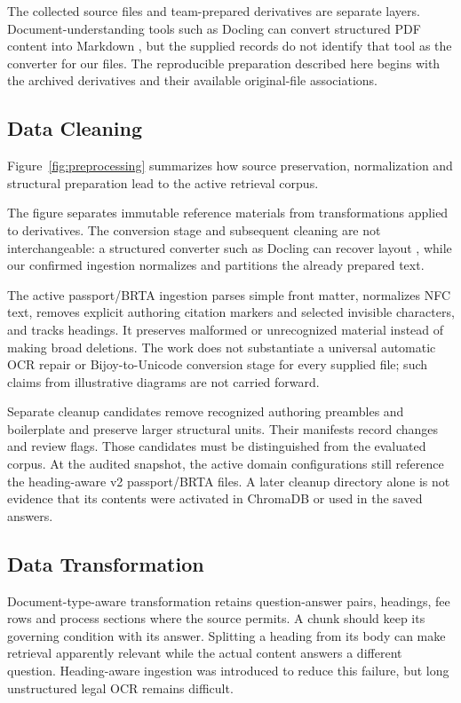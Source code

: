 The collected source files and team-prepared derivatives are separate layers. Document-understanding tools such as Docling can convert structured PDF content into Markdown \cite{docling}, but the supplied records do not identify that tool as the converter for our files. The reproducible preparation described here begins with the archived derivatives and their available original-file associations.

\subsection{Data Cleaning}
Figure~\ref{fig:preprocessing} summarizes how source preservation, normalization and structural preparation lead to the active retrieval corpus.

The figure separates immutable reference materials from transformations applied to derivatives. The conversion stage and subsequent cleaning are not interchangeable: a structured converter such as Docling can recover layout \cite{docling}, while our confirmed ingestion normalizes and partitions the already prepared text.

The active passport/BRTA ingestion parses simple front matter, normalizes NFC text, removes explicit authoring citation markers and selected invisible characters, and tracks headings. It preserves malformed or unrecognized material instead of making broad deletions. The work does not substantiate a universal automatic OCR repair or Bijoy-to-Unicode conversion stage for every supplied file; such claims from illustrative diagrams are not carried forward.

Separate cleanup candidates remove recognized authoring preambles and boilerplate and preserve larger structural units. Their manifests record changes and review flags. Those candidates must be distinguished from the evaluated corpus. At the audited snapshot, the active domain configurations still reference the heading-aware v2 passport/BRTA files. A later cleanup directory alone is not evidence that its contents were activated in ChromaDB or used in the saved answers.

\subsection{Data Transformation}
Document-type-aware transformation retains question-answer pairs, headings, fee rows and process sections where the source permits. A chunk should keep its governing condition with its answer. Splitting a heading from its body can make retrieval apparently relevant while the actual content answers a different question. Heading-aware ingestion was introduced to reduce this failure, but long unstructured legal OCR remains difficult.


